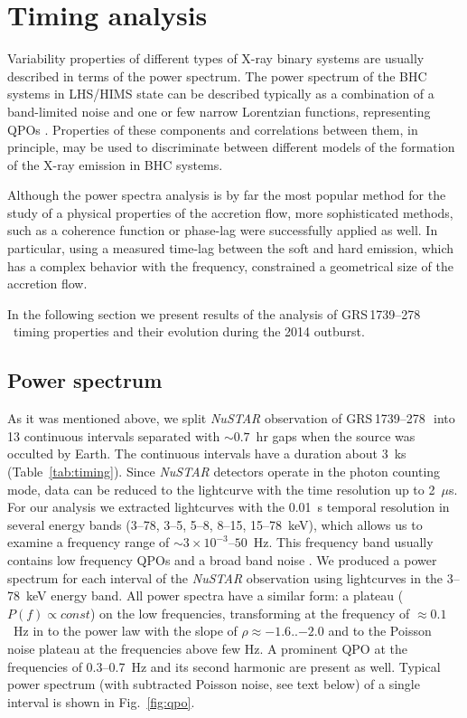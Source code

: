 \documentclass[a4paper,fleqn,usenatbib]{mnras}
\def\grs{{GRS\,1739--278\,}}
\begin{document}
            

\section{Timing analysis} 

Variability properties of different types of X-ray binary systems are usually described in terms of the power spectrum.
The power spectrum of the BHC systems in LHS/HIMS state can be described typically as a combination of a band-limited noise and one or few narrow Lorentzian functions, representing QPOs \citep[see, e.g.,][]{1972ApJ...174L..35T, 1990A&A...227L..33B, homan05}. 
Properties of these components and correlations between them, in principle, may be used to discriminate between different models of the formation of the X-ray emission in BHC systems. 
 
Although the power spectra analysis is by far the most popular method for the study of a physical properties of the accretion flow, more sophisticated methods, such as a coherence function or phase-lag were successfully applied as well. 
In particular, using a measured time-lag between the soft and hard emission, which has a complex behavior with the frequency, \citet{1999ApJ...517..355N} constrained a geometrical size of the accretion flow. 

In the following section we present results of the analysis of \grs\ timing properties and their evolution during the 2014 outburst.

\subsection{Power spectrum}

As it was mentioned above, we split {\it NuSTAR} observation of \grs\ into 13 continuous intervals separated with $\sim0.7$~hr gaps when the source was occulted by Earth. 
The continuous intervals have a duration about 3~ks (Table~\ref{tab:timing}).
Since {\it NuSTAR} detectors operate in the photon counting mode, data can be reduced to the lightcurve with the time resolution up to 2~$\mu$s.
For our analysis we extracted lightcurves with the 0.01~s temporal resolution in several energy bands (3--78, 3--5, 5--8, 8--15, 15--78~keV), which allows us to examine a frequency range of $\sim3\times10^{-3}$--$50$~Hz.
This frequency band usually contains low frequency QPOs and a broad band noise \citep{wijnands99}.
We produced a power spectrum for each interval of the {\it NuSTAR} observation using lightcurves in the 3--78~keV energy band.
All power spectra have a similar form: a plateau ($P(f)\propto const$) on the low frequencies, transforming at the frequency of $\approx0.1$~Hz in to the power law with the slope of $\rho\approx-1.6$..$-2.0$ and to the Poisson noise plateau at the frequencies above few Hz. 
A prominent QPO at the frequencies of 0.3--0.7~Hz and its second harmonic are present as well. 
Typical power spectrum (with subtracted Poisson noise, see text below) of a single interval is shown in Fig.~\ref{fig:qpo}.
\end{document}
